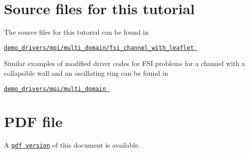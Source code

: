  

\hypertarget{index_sources}{}\section{Source files for this tutorial}\label{index_sources}
The source files for this tutorial can be found in

\begin{center} \href{../../../../demo_drivers/mpi/multi_domain/fsi_channel_with_leaflet}{\tt demo\+\_\+drivers/mpi/multi\+\_\+domain/fsi\+\_\+channel\+\_\+with\+\_\+leaflet } \end{center} 

Similar examples of modified driver codes for F\+SI problems for a channel with a collapsible wall and an oscillating ring can be found in \begin{center} \href{../../../../demo_drivers/mpi/multi_domain/}{\tt demo\+\_\+drivers/mpi/multi\+\_\+domain } \end{center} 



 

 \hypertarget{index_pdf}{}\section{P\+D\+F file}\label{index_pdf}
A \href{../latex/refman.pdf}{\tt pdf version} of this document is available. 

